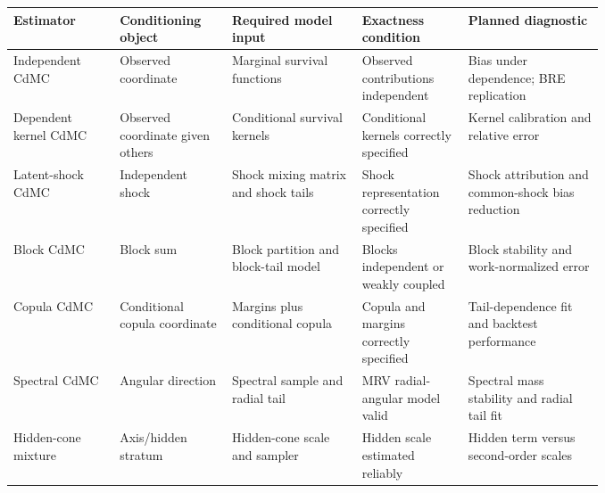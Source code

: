 \begin{tabularx}{\linewidth}{p{0.18\linewidth}p{0.19\linewidth}p{0.22\linewidth}p{0.18\linewidth}X}
\toprule
Estimator & Conditioning object & Required model input & Exactness condition & Planned diagnostic \\
\midrule
Independent CdMC & Observed coordinate & Marginal survival functions & Observed contributions independent & Bias under dependence; BRE replication \\
Dependent kernel CdMC & Observed coordinate given others & Conditional survival kernels & Conditional kernels correctly specified & Kernel calibration and relative error \\
Latent-shock CdMC & Independent shock & Shock mixing matrix and shock tails & Shock representation correctly specified & Shock attribution and common-shock bias reduction \\
Block CdMC & Block sum & Block partition and block-tail model & Blocks independent or weakly coupled & Block stability and work-normalized error \\
Copula CdMC & Conditional copula coordinate & Margins plus conditional copula & Copula and margins correctly specified & Tail-dependence fit and backtest performance \\
Spectral CdMC & Angular direction & Spectral sample and radial tail & MRV radial-angular model valid & Spectral mass stability and radial tail fit \\
Hidden-cone mixture & Axis/hidden stratum & Hidden-cone scale and sampler & Hidden scale estimated reliably & Hidden term versus second-order scales \\
\bottomrule
\end{tabularx}
